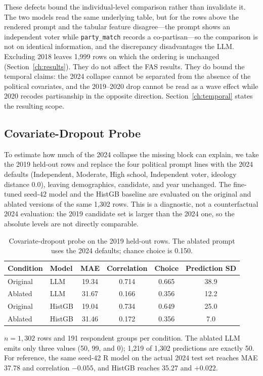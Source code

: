 These defects bound the individual-level comparison rather than invalidate it.
The two models read the same underlying table, but for the rows above the
rendered prompt and the tabular feature disagree---the prompt shows an
independent voter while \texttt{party\_match} records a co-partisan---so the
comparison is not on identical information, and the discrepancy disadvantages
the LLM. Excluding 2018 leaves 1,999 rows on which the ordering is unchanged
(Section~\ref{ch:results}). They do not affect the FAS results. They do bound the temporal claims: the 2024 collapse cannot be
separated from the absence of the political covariates, and the 2019--2020 drop
cannot be read as a wave effect while 2020 recodes partisanship in the opposite
direction. Section~\ref{ch:temporal} states the resulting scope.

\subsection{Covariate-Dropout Probe}
\label{app:covariate_probe}

To estimate how much of the 2024 collapse the missing block can explain, we
take the 2019 held-out rows and replace the four political prompt lines with the
2024 defaults (Independent, Moderate, High school, Independent voter, ideology
distance 0.0), leaving demographics, candidate, and year unchanged. The
fine-tuned seed-42 model and the HistGB baseline are evaluated on the original
and ablated versions of the same 1,302 rows. This is a diagnostic, not a
counterfactual 2024 evaluation: the 2019 candidate set is larger than the 2024
one, so the absolute levels are not directly comparable.

\begin{table}[h]
\centering
\small
\caption{Covariate-dropout probe on the 2019 held-out rows. The ablated prompt
uses the 2024 defaults; chance choice is 0.150.}
\label{tab:covariate_probe}
\begin{tabular}{llcccc}
\toprule
Condition & Model & MAE & Correlation & Choice & Prediction SD \\
\midrule
Original & LLM & 19.34 & 0.714 & 0.665 & 38.9 \\
Ablated & LLM & 31.67 & 0.166 & 0.356 & 12.2 \\
Original & HistGB & 19.04 & 0.734 & 0.649 & 25.0 \\
Ablated & HistGB & 31.46 & 0.172 & 0.356 & 7.0 \\
\bottomrule
\end{tabular}
\par\smallskip\footnotesize
$n=1{,}302$ rows and 191 respondent groups per condition. The ablated LLM emits
only three values (50, 99, and 0); 1,219 of 1,302 predictions are exactly 50.
For reference, the same seed-42 R model on the actual 2024 test set reaches MAE
37.78 and correlation $-0.055$, and HistGB reaches 35.27 and $+0.022$.
\end{table}

